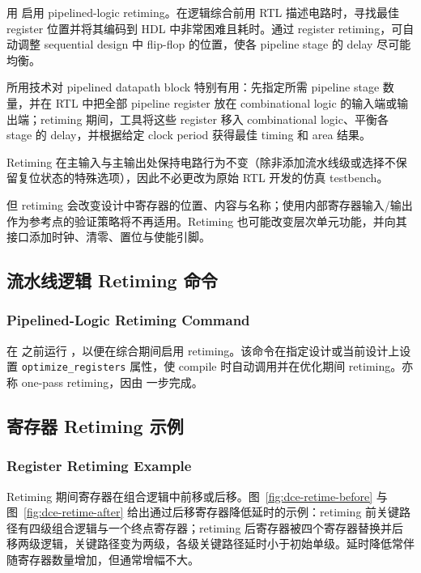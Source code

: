 用  启用 pipelined-logic retiming。在逻辑综合前用 RTL 描述电路时，寻找最佳 register 位置并将其编码到 HDL 中非常困难且耗时。通过 register retiming，可自动调整 sequential design 中 flip-flop 的位置，使各 pipeline stage 的 delay 尽可能均衡。

 所用技术对 pipelined datapath block 特别有用：先指定所需 pipeline stage 数量，并在 RTL 中把全部 pipeline register 放在 combinational logic 的输入端或输出端；retiming 期间，工具将这些 register 移入 combinational logic、平衡各 stage 的 delay，并根据给定 clock period 获得最佳 timing 和 area 结果。

Retiming 在主输入与主输出处保持电路行为不变（除非添加流水线级或选择不保留复位状态的特殊选项），因此不必更改为原始 RTL 开发的仿真 testbench。

但 retiming 会改变设计中寄存器的位置、内容与名称；使用内部寄存器输入/输出作为参考点的验证策略将不再适用。Retiming 也可能改变层次单元功能，并向其接口添加时钟、清零、置位与使能引脚。

\subsection{流水线逻辑 Retiming 命令}
\subsubsection*{Pipelined-Logic Retiming Command}

在  之前运行 ，以便在综合期间启用 retiming。该命令在指定设计或当前设计上设置 \texttt{optimize\_registers} 属性，使 compile 时自动调用并在优化期间 retiming。亦称 one-pass retiming，因由  一步完成。

\subsection{寄存器 Retiming 示例}
\subsubsection*{Register Retiming Example}

Retiming 期间寄存器在组合逻辑中前移或后移。图~\ref{fig:dce-retime-before} 与图~\ref{fig:dce-retime-after} 给出通过后移寄存器降低延时的示例：retiming 前关键路径有四级组合逻辑与一个终点寄存器；retiming 后寄存器被四个寄存器替换并后移两级逻辑，关键路径变为两级，各级关键路径延时小于初始单级。延时降低常伴随寄存器数量增加，但通常增幅不大。

